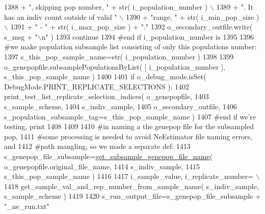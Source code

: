 \begin{DoxyCode}
1388                                 + \textcolor{stringliteral}{", skipping pop number, "}  + str( i\_population\_number ) \(\backslash\)
1389                                 + \textcolor{stringliteral}{".  It has an indiv count outside of valid "} \(\backslash\)
1390                                 + \textcolor{stringliteral}{"range, "} + str( i\_min\_pop\_size ) \(\backslash\)
1391                                 + \textcolor{stringliteral}{" - "} + str( i\_max\_pop\_size ) + \textcolor{stringliteral}{"."}
1392                 o\_secondary\_outfile.write( s\_msg + \textcolor{stringliteral}{"\(\backslash\)n"} )
1393                 \textcolor{keywordflow}{continue}
1394             \textcolor{comment}{#end if i\_population\_number is}
1395 
1396             \textcolor{comment}{#we make population subsample list consisting of only this populations number:}
1397             s\_this\_pop\_sample\_name=str( i\_population\_number ) 
1398 
1399             o\_genepopfile.subsamplePopulationsByList( [ i\_population\_number ], s\_this\_pop\_sample\_name )
1400 
1401             \textcolor{keywordflow}{if} o\_debug\_mode.isSet( DebugMode.PRINT\_REPLICATE\_SELECTIONS ):
1402                 print\_test\_list\_replicate\_selection\_indices( o\_genepopfile, 
1403                                         s\_sample\_scheme,    
1404                                         s\_indiv\_sample, 
1405                                         o\_secondary\_outfile, 
1406                                         s\_population\_subsample\_tag=s\_this\_pop\_sample\_name )
1407             \textcolor{comment}{#end if we're testing, print }
1408             
1409 
1410             \textcolor{comment}{#in naming a the genepop file for the subsampled pop,}
1411             \textcolor{comment}{#some processing is needed to avoid NeEstimator file naming errors, and}
1412             \textcolor{comment}{#path mangling, so we made a separate def:}
1413             s\_genepop\_file\_subsample=\hyperlink{namespacenegui_1_1pgdriveneestimator_a84955fc339f0354149185b5fa6444340}{get\_subsample\_genepop\_file\_name}( 
      o\_genepopfile.original\_file\_name, 
1414                                                     s\_indiv\_sample, 
1415                                                     s\_this\_pop\_sample\_name )
1416 
1417             i\_sample\_value, i\_replicate\_number= \(\backslash\)
1418                         get\_sample\_val\_and\_rep\_number\_from\_sample\_name( s\_indiv\_sample, s\_sample\_scheme )
1419 
1420             s\_run\_output\_file=s\_genepop\_file\_subsample + \textcolor{stringliteral}{"\_ne\_run.txt"}

\end{DoxyCode}
